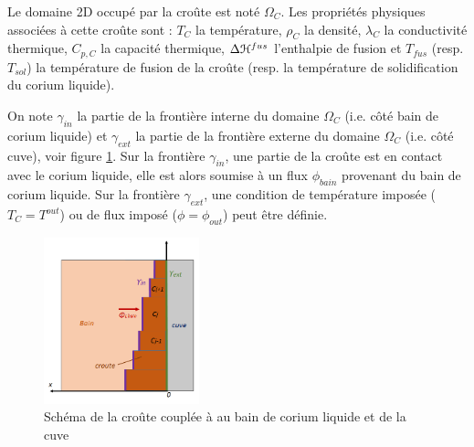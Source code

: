Le domaine 2D occupé par la croûte est noté $\Omega_C$. Les propriétés physiques associées à cette croûte sont : $T_C$ la température, $\rho_C$ la densité, $\lambda_C$ la conductivité thermique, $C_{p,C}$ la capacité thermique, $\Delta {\cal H}^{fus}$ l'enthalpie de fusion et $T_{fus}$ (resp. $T_{sol}$) la température de fusion de la croûte (resp. la température de solidification du corium liquide).


On note $\gamma_{in}$ la partie de la frontière interne du domaine $\Omega_C$ (i.e. côté bain de corium liquide) et $\gamma_{ext}$ la partie de la frontière externe du domaine $\Omega_C$ (i.e. côté cuve), voir figure \ref{fig:crust_figure}. Sur la frontière $\gamma_{in}$, une partie de la croûte est en contact avec le corium liquide, elle est alors soumise à un flux $\phi_{bain}$ provenant du bain de corium liquide. Sur la frontière $\gamma_{ext}$, une condition de température imposée ($T_C=T^{out}$) ou de flux imposé ($\phi=\phi_{out}$) peut être définie.

\begin{figure}[H]
\centering
\includegraphics[width=0.4\textwidth]{Figures/crust_figure.png}
\caption{Schéma de la croûte couplée à au bain de corium liquide et de la cuve} \label{fig:crust_figure}
\end{figure}

